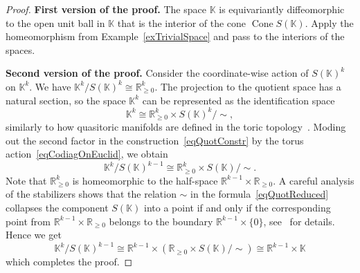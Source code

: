\documentclass[english, 12pt]{amsproc}
\numberwithin{equation}{section}
\theoremstyle{plain}
\theoremstyle{definition}
\theoremstyle{remark}
\DeclareMathOperator{\Cone}{Cone}
\newcommand{\simc}{\!\!\sim}
\newcommand{\Ro}{\mathbb{R}}
\newcommand{\Rg}{\mathbb{R}_{\geqslant 0}}
\newcommand{\Ko}{\mathbb{K}}
\begin{document}
\begin{proof}
\textbf{First version of the proof.} The space $\Ko$ is equi\-va\-ri\-ant\-ly diffeomorphic to the open unit ball in $\Ko$ that is the interior of the cone $\Cone S(\Ko)$. Apply the homeomorphism from Example~\ref{exTrivialSpace} and pass to the interiors of the spaces.

\textbf{Second version of the proof.} Consider the coordinate-wise action of $S(\Ko)^k$ on $\Ko^k$. We have $\Ko^k/S(\Ko)^k\cong \Rg^k$. The projection to the quotient space has a natural section, so the space $\Ko^k$ can be represented as the identification space
\begin{equation}\label{eqQuotConstr}
\Ko^k\cong \Rg^k\times S(\Ko)^k/\simc,
\end{equation}
similarly to how quasitoric manifolds are defined in the toric topology~\cite{BPnew}. Moding out the second factor in the construction~\eqref{eqQuotConstr} by the torus action~\eqref{eqCodiagOnEuclid}, we obtain
\begin{equation}\label{eqQuotReduced}
\Ko^k/S(\Ko)^{k-1}\cong \Rg^k\times S(\Ko)/\simc.
\end{equation}
Note that $\Rg^k$ is homeomorphic to the half-space $\Ro^{k-1}\times \Rg$. A careful analysis of the stabilizers shows that the relation $\sim$ in the formula~\eqref{eqQuotReduced} collapses the component $S(\Ko)$ into a point if and only if the corresponding point from $\Ro^{k-1}\times \Rg$ belongs to the boundary $\Ro^{k-1}\times\{0\}$, see~\cite{AyzCompl} for details. Hence we get
\[
\Ko^k/S(\Ko)^{k-1}\cong \Ro^{k-1}\times (\Rg\times S(\Ko)/\simc)\cong \Ro^{k-1}\times\Ko
\]
which completes the proof.

\end{proof}
\end{document}
